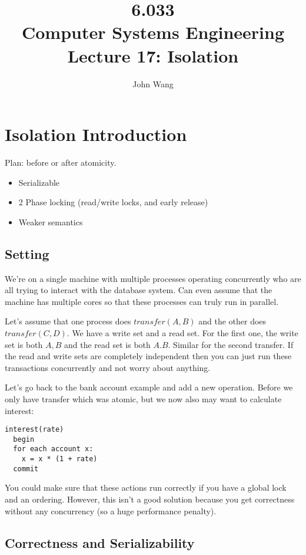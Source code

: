 \documentclass[psamsfonts]{amsart}
\title{6.033 \\
Computer Systems Engineering \\
Lecture 17: Isolation}
\author{John Wang}
\begin{document}
\maketitle

\section{Isolation Introduction}

Plan: before or after atomicity.

\begin{itemize}
  \item Serializable
  \item 2 Phase locking (read/write locks, and early release)
  \item Weaker semantics
\end{itemize}

\subsection{Setting}

We're on a single machine with multiple processes operating concurrently who are all trying to interact with the database system. Can even assume that the machine has multiple cores so that these processes can truly run in parallel.

Let's assume that one process does $transfer(A,B)$ and the other does $transfer(C,D)$. We have a write set and a read set. For the first one, the write set is both $A,B$ and the read set is both $A.B$. Similar for the second transfer. If the read and write sets are completely independent then you can just run these transactions concurrently and not worry about anything.

Let's go back to the bank account example and add a new operation. Before we only have transfer which was atomic, but we now also may want to calculate interest:

\begin{verbatim}
interest(rate)
  begin
  for each account x:
    x = x * (1 + rate)
  commit
\end{verbatim}

You could make sure that these actions run correctly if you have a global lock and an ordering. However, this isn't a good solution because you get correctness without any concurrency (so a huge performance penalty).

\subsection{Correctness and Serializability}
\end{document}
